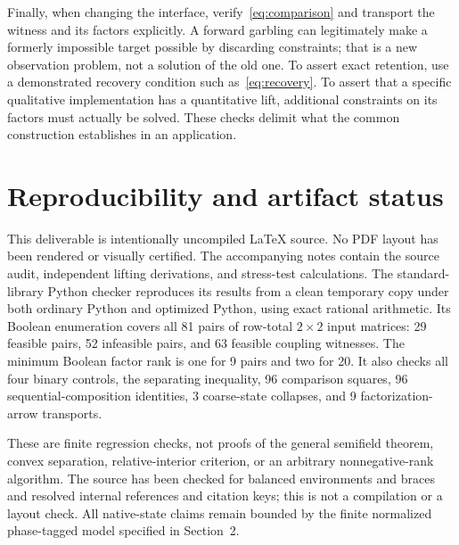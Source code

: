\documentclass[11pt]{article}
\theoremstyle{remark}
\begin{document}
Finally, when changing the interface, verify~\eqref{eq:comparison} and transport the witness and its factors explicitly. A forward garbling can legitimately make a formerly impossible target possible by discarding constraints; that is a new observation problem, not a solution of the old one. To assert exact retention, use a demonstrated recovery condition such as~\eqref{eq:recovery}. To assert that a specific qualitative implementation has a quantitative lift, additional constraints on its factors must actually be solved. These checks delimit what the common construction establishes in an application.

\section{Reproducibility and artifact status}

This deliverable is intentionally uncompiled \LaTeX{} source. No PDF layout has been rendered or visually certified. The accompanying notes contain the source audit, independent lifting derivations, and stress-test calculations. The standard-library Python checker reproduces its results from a clean temporary copy under both ordinary Python and optimized Python, using exact rational arithmetic. Its Boolean enumeration covers all 81 pairs of row-total $2\times2$ input matrices: 29 feasible pairs, 52 infeasible pairs, and 63 feasible coupling witnesses. The minimum Boolean factor rank is one for 9 pairs and two for 20. It also checks all four binary controls, the separating inequality, 96 comparison squares, 96 sequential-composition identities, 3 coarse-state collapses, and 9 factorization-arrow transports.

These are finite regression checks, not proofs of the general semifield theorem, convex separation, relative-interior criterion, or an arbitrary nonnegative-rank algorithm. The source has been checked for balanced environments and braces and resolved internal references and citation keys; this is not a compilation or a layout check. All native-state claims remain bounded by the finite normalized phase-tagged model specified in Section~2.
\end{document}
